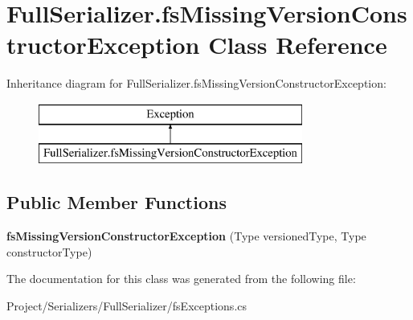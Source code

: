 \hypertarget{class_full_serializer_1_1fs_missing_version_constructor_exception}{}\section{Full\+Serializer.\+fs\+Missing\+Version\+Constructor\+Exception Class Reference}
\label{class_full_serializer_1_1fs_missing_version_constructor_exception}
Inheritance diagram for Full\+Serializer.\+fs\+Missing\+Version\+Constructor\+Exception\+:\begin{figure}[H]
\begin{center}
\leavevmode
\includegraphics[height=2.000000cm]{class_full_serializer_1_1fs_missing_version_constructor_exception}
\end{center}
\end{figure}
\subsection*{Public Member Functions}
\begin{DoxyCompactItemize}
\item 
\mbox{\label{class_full_serializer_1_1fs_missing_version_constructor_exception_a4bf3e78b5009a68188abfb9bdc8b4f0f}} 
{\bfseries fs\+Missing\+Version\+Constructor\+Exception} (Type versioned\+Type, Type constructor\+Type)
\end{DoxyCompactItemize}


The documentation for this class was generated from the following file\+:\begin{DoxyCompactItemize}
\item 
Project/\+Serializers/\+Full\+Serializer/fs\+Exceptions.\+cs\end{DoxyCompactItemize}
